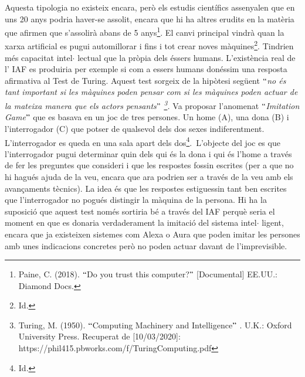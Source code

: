 \documentclass[12pt]{article}
\begin{document}
\begin{enumerate}
\vspace{\baselineskip}
\begin{justify}
Aquesta tipologia no existeix encara, però els estudis científics assenyalen que en uns 20 anys podria haver-se assolit, encara que hi ha altres erudits en la matèria que afirmen que s’assolirà abans de 5 anys\footnote{ Paine, C. (2018). $``$Do you trust this computer?$"$  [Documental] EE.UU.: Diamond Docs. }. El canvi principal vindrà quan la xarxa artificial es pugui automillorar i fins i tot crear noves màquines\footnote{ Id. }. Tindrien més capacitat intel$ \cdot $ lectual que la pròpia dels éssers humans.  L’existència real de l’ IAF es produiria per exemple si com a essers humans donéssim una resposta afirmativa al Test de Turing. Aquest test sorgeix de la hipòtesi següent \textit{$``$no és tant important si les màquines poden pensar com si les màquines poden actuar de la mateixa manera que els actors pensants$"$ \footnote{ Turing, M. (1950). $``$Computing Machinery and Intelligence$"$ . U.K.: Oxford University Press. Recuperat de [10/03/2020]: https://phil415.pbworks.com/f/TuringComputing.pdf }. }Va proposar l’anomenat $``$\textit{Imitation Game}$"$  que es basava en un joc de tres persones. Un home (A), una dona (B) i l’interrogador (C) que potser de qualsevol dels dos sexes indiferentment. L’interrogador es queda en una sala apart dels dos\footnote{ Id. }.\  L’objecte del joc es que l’interrogador pugui determinar quin dels qui és la dona i qui és l’home a través de fer les preguntes que consideri i que les respostes fossin escrites (per a que no hi hagués ajuda de la veu, encara que ara podrien ser a través de la veu amb els avançaments tècnics). La idea és que les respostes estiguessin tant ben escrites que l’interrogador no pogués distingir la màquina de la persona. Hi ha la suposició que aquest test només sortiria bé a través del IAF perquè seria el moment en que es donaria verdaderament la imitació del sistema intel$ \cdot $ ligent, encara que ja existeixen sistemes com Alexa o Aura que poden imitar les persones amb unes indicacions concretes però no poden actuar davant de l’imprevisible. 
\end{justify}\par



\end{enumerate}
\end{document}
